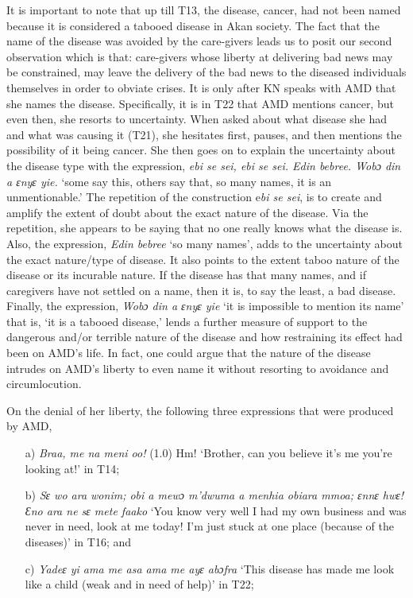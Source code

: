 \documentclass[output=paper,colorlinks,citecolor=brown]{langscibook}
\begin{document}
It is important to note that up till T13, the disease, cancer, had not been named because it is considered a tabooed disease in Akan society. The fact that the name of the disease was avoided by the care-givers leads us to posit our second observation which is that: care-givers whose liberty at delivering bad news may be constrained, may leave the delivery of the bad news to the diseased individuals themselves in order to obviate crises. It is only after KN speaks with AMD that she names the disease. Specifically, it is in T22 that AMD mentions cancer, but even then, she resorts to uncertainty. When asked about what disease she had and what was causing it (T21), she hesitates first, pauses, and then mentions the possibility of it being cancer. She then goes on to explain the uncertainty about the disease type with the expression, \textit{ebi se sei, ebi se sei. Edin bebree. Wobɔ din a ɛnyɛ yie.} ‘some say this, others say that, so many names, it is an unmentionable.’ The repetition of the construction e\textit{bi se sei}, is to create and amplify the extent of doubt about the exact nature of the disease. Via the repetition, she appears to be saying that no one really knows what the disease is. Also, the expression, \textit{Edin bebree} ‘so many names’, adds to the uncertainty about the exact nature/type of disease. It also points to the extent taboo nature of the disease or its incurable nature. If the disease has that many names, and if caregivers have not settled on a name, then it is, to say the least, a bad disease. Finally, the expression, \textit{Wobɔ din a ɛnyɛ yie} ‘it is impossible to mention its name’ that is, ‘it is a tabooed disease,’ lends a further measure of support to the dangerous and/or terrible nature of the disease and how restraining its effect had been on AMD’s life. In fact, one could argue that the nature of the disease intrudes on AMD’s liberty to even name it without resorting to avoidance and circumlocution.

On the denial of her liberty, the following three expressions that were produced by AMD,

\begin{enumerate}
    \item[a)] 	\textit{Braa, me na meni oo! }(1.0) Hm! ‘Brother, can you believe it’s me you’re looking at!’ in T14; 
    \item[b)]   \textit{Sɛ wo ara wonim; obi a mewɔ m’dwuma a menhia obiara mmoa; ɛnnɛ hwɛ! Ɛno ara ne sɛ mete faako} ‘You know very well I had my own business and was never in need, look at me today! I’m just stuck at one place (because of the diseases)’ in T16; and
    \item[c)]   \textit{Yadeɛ yi ama me asa ama me ayɛ abɔfra} ‘This disease has made me look like a child (weak and in need of help)’ in T22; 
\end{enumerate}
\end{document}
